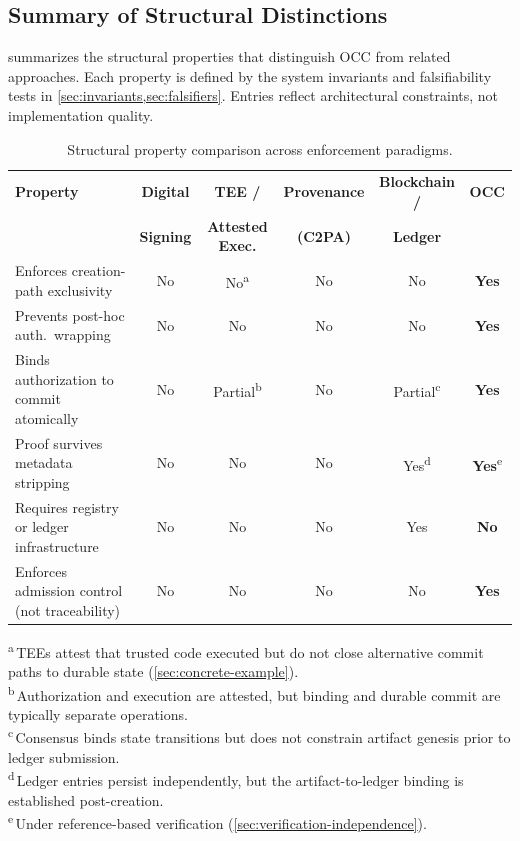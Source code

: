 \documentclass[11pt,letterpaper]{article}
\theoremstyle{occplain}
\theoremstyle{occremark}
\begin{document}
\subsection{Summary of Structural Distinctions}
\label{sec:structural-distinctions}

 summarizes the structural properties that distinguish OCC from related approaches. Each property is defined by the system invariants and falsifiability tests in \cref{sec:invariants,sec:falsifiers}. Entries reflect architectural constraints, not implementation quality.

\begin{table}[htbp]
\centering
\caption{Structural property comparison across enforcement paradigms.}
\label{tab:comparison}
\small
\begin{tabular}{@{}lccccc@{}}
\toprule
\textbf{Property} &
\textbf{Digital} &
\textbf{TEE /} &
\textbf{Provenance} &
\textbf{Blockchain /} &
\textbf{OCC} \\
& \textbf{Signing} & \textbf{Attested Exec.} & \textbf{(C2PA)} & \textbf{Ledger} & \\
\midrule
Enforces creation-path exclusivity
  & No & No\textsuperscript{a} & No & No & \textbf{Yes} \\
Prevents post-hoc auth.\ wrapping
  & No & No & No & No & \textbf{Yes} \\
Binds authorization to commit atomically
  & No & Partial\textsuperscript{b} & No & Partial\textsuperscript{c} & \textbf{Yes} \\
Proof survives metadata stripping
  & No & No & No & Yes\textsuperscript{d} & \textbf{Yes}\textsuperscript{e} \\
Requires registry or ledger infrastructure
  & No & No & No & Yes & \textbf{No} \\
Enforces admission control (not traceability)
  & No & No & No & No & \textbf{Yes} \\
\bottomrule
\end{tabular}

\medskip
{\scriptsize
\textsuperscript{a}\,TEEs attest that trusted code executed but do not close alternative commit paths to durable state (\cref{sec:concrete-example}).\\
\textsuperscript{b}\,Authorization and execution are attested, but binding and durable commit are typically separate operations.\\
\textsuperscript{c}\,Consensus binds state transitions but does not constrain artifact genesis prior to ledger submission.\\
\textsuperscript{d}\,Ledger entries persist independently, but the artifact-to-ledger binding is established post-creation.\\
\textsuperscript{e}\,Under reference-based verification (\cref{sec:verification-independence}).
}
\end{table}
\end{document}
